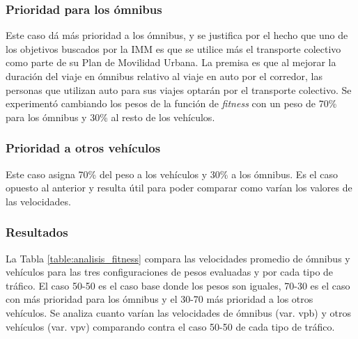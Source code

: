 

\subsubsection{Prioridad para los ómnibus}
Este caso dá más prioridad a los ómnibus, y se justifica por el hecho que uno de los objetivos buscados por la IMM es que se utilice más el transporte colectivo como parte de su Plan de Movilidad Urbana. La premisa es que al mejorar la duración del viaje en ómnibus relativo al viaje en auto por el corredor, las personas que utilizan auto para sus viajes optarán por el transporte colectivo. Se experimentó cambiando los pesos de la función de \emph{fitness} con un peso de 70\% para los ómnibus y 30\% al resto de los vehículos.


\subsubsection{Prioridad a otros vehículos}

Este caso asigna 70\% del peso a los vehículos y 30\% a los ómnibus. Es el caso opuesto al anterior y resulta útil para poder comparar como varían los valores de las velocidades.

\subsubsection{Resultados}

La Tabla \ref{table:analisis_fitness} compara las velocidades promedio de ómnibus y vehículos para las tres configuraciones de pesos evaluadas y por cada tipo de tráfico.  El caso 50-50 es el caso base donde los pesos son iguales, 70-30 es el caso con más prioridad para los ómnibus y el 30-70 más prioridad a los otros vehículos. Se analiza cuanto varían las velocidades de ómnibus (var. vpb) y otros vehículos (var. vpv) comparando contra el caso 50-50 de cada tipo de tráfico.


